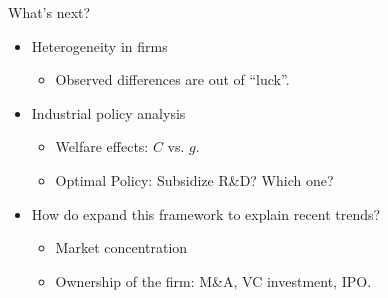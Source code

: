 \documentclass[usenames,dvipsnames,aspectratio=169]{beamer}
\begin{document}
\begin{frame}{What's next?}

\begin{itemize}[label=\textcolor{teal}{$\blacktriangleright$}]
\vfill
\item Heterogeneity in firms  
\begin{itemize}[label=\textcolor{teal}{$\star$}]
\item Observed differences are out of ``luck''. 
\end{itemize}
\vfill
\item Industrial policy analysis
\begin{itemize}[label=\textcolor{teal}{$\star$}]
\item Welfare effects: $C$ vs. $g$.
\item Optimal Policy: Subsidize R\&D? Which one?
\end{itemize}
\vfill 
\item How do expand this framework to explain recent trends?
\begin{itemize}[label=\textcolor{teal}{$\star$}]
\item Market concentration
\item Ownership of the firm: M\&A, VC investment, IPO. 
\end{itemize}
\vfill
\end{itemize}

\end{frame}
\end{document}
